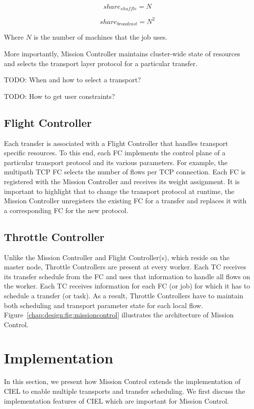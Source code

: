 \documentclass[a4paper,12pt,twoside,openright]{report}
\begin{document}
\begin{equation}
  share_{shuffle} = N
\end{equation}

\begin{equation}
  share_{broadcast} = N^2
\end{equation}

Where $N$ is the number of machines that the job uses.

More importantly, Mission Controller maintains cluster-wide state of resources
and selects the transport layer protocol for a particular transfer.

\textsf{TODO: When and how to select a transport?}

\textsf{TODO: How to get user constraints?}

\subsection{Flight Controller}
Each transfer is associated with a Flight Controller that handles transport
specific resources. To this end, each FC implements the control plane of a
particular transport protocol and its various parameters.
For example, the multipath TCP FC selects the number of flows per TCP
connection. Each FC is registered with the Mission Controller and receives its
weight assignment. It is important to highlight that to change the transport
protocol at runtime, the Mission Controller unregisters the existing FC for a
transfer and replaces it with a corresponding FC for the new protocol.

\subsection{Throttle Controller}
Unlike the Mission Controller and Flight Controller(s), which reside on the
master node, Throttle Controllers are present at every worker. Each TC receives
its transfer schedule from the FC and uses that information to handle all flows
on the worker. Each TC receives information for each FC (or job) for which it
has to schedule a transfer (or task). As a result, Throttle Controllers have to
maintain both scheduling and transport parameter state for each local flow.
Figure~\ref{chap:design:fig:missioncontrol} illustrates the architecture of
Mission Control.

\section{Implementation}
In this section, we present how Mission Control extends the implementation of
CIEL to enable multiple transports and transfer scheduling. We first discuss the
implementation features of CIEL which are important for Mission Control.
\end{document}
